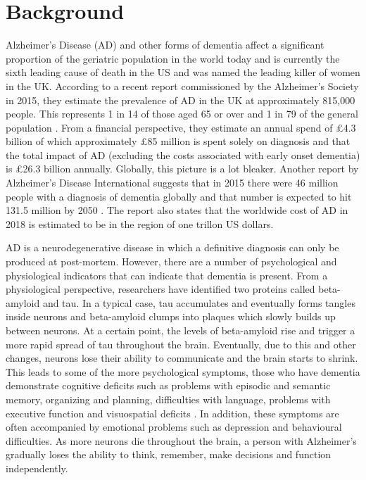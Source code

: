 \section{Background}
Alzheimer's Disease (AD) and other forms of dementia affect a significant proportion of the geriatric population in the world today and is currently the sixth leading cause of death in the US and was named the leading killer of women in the UK. According to a recent report commissioned by the Alzheimer's Society in 2015, they estimate the prevalence of AD in the UK at approximately 815,000 people. This represents 1 in 14 of those aged 65 or over and 1 in 79 of the general population \cite{AlzheimersSociety2014}. From a financial perspective, they estimate an annual spend of £4.3 billion of which approximately £85 million is spent solely on diagnosis and that the total impact of AD (excluding the costs associated with early onset dementia) is £26.3 billion annually. Globally, this picture is a lot bleaker. Another report by Alzheimer's Disease International suggests that in 2015 there were 46 million people with a diagnosis of dementia globally and that number is expected to hit 131.5 million by 2050 \cite{Prince2015}. The report also states that the worldwide cost of AD in 2018 is estimated to be in the region of one trillon US dollars.
\par 
AD is a neurodegenerative disease in which a definitive diagnosis can only be produced at post-mortem. However, there are a number of psychological and physiological indicators that can indicate that dementia is present. From a physiological perspective, researchers have identified two proteins called beta-amyloid and tau. In a typical case, tau accumulates and eventually forms tangles inside neurons and beta-amyloid clumps into plaques which slowly builds up between neurons. At a certain point, the levels of beta-amyloid rise and trigger a more rapid spread of tau throughout the brain. Eventually, due to this and other changes, neurons lose their ability to communicate and the brain starts to shrink. This leads to some of the more psychological symptoms, those who have dementia demonstrate cognitive deficits such as problems with episodic and semantic memory, organizing and planning, difficulties with language, problems with executive function and visuospatial deficits \cite{McKhann2011}. In addition, these symptoms are often accompanied by emotional problems such as depression and behavioural difficulties. As more neurons die throughout the brain, a person with Alzheimer's gradually loses the ability to think, remember, make decisions and function independently.
